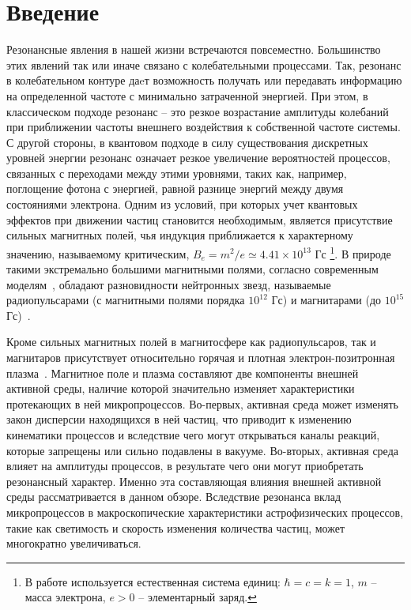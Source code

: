 \section{Введение}
Резонансные явления в нашей жизни встречаются повсеместно. Большинство этих явлений так или иначе связано с колебательными процессами. Так, резонанс в колебательном контуре даeт возможность получать или передавать информацию 
на определенной частоте с минимально затраченной энергией. При этом, в 
классическом подходе резонанс -- это резкое возрастание амплитуды колебаний при 
приближении частоты внешнего воздействия к собственной частоте системы. С 
другой стороны, в квантовом подходе в силу существования дискретных уровней 
энергии резонанс означает резкое увеличение вероятностей процессов, связанных с 
переходами между этими уровнями, таких как, например, поглощение фотона с 
энергией, равной разнице энергий между двумя состояниями электрона. Одним из 
условий, при которых учет квантовых эффектов при движении частиц становится 
необходимым, является присутствие сильных магнитных полей, чья индукция 
приближается к характерному значению, называемому критическим, $B_e = m^2 / e 
\simeq 4.41 \times 10^{13}$ Гс \footnote{В работе используется естественная 
система единиц: $\hbar = c = k = 1$, $m$ -- масса электрона, $e > 0$ --  
элементарный заряд.}. В природе такими экстремально большими магнитными полями, 
согласно современным моделям~\cite{Duncan:1995,Thompson:1996,Thompson:2002}, 
обладают разновидности нейтронных звезд, называемые радиопульсарами (с 
магнитными полями порядка $10^{12}$ Гс) и магнитарами (до $10^{15}$ 
Гс)~\cite{McGill:Cite}.

Кроме сильных магнитных полей в магнитосфере как радиопульсаров, так и магнитаров присутствует относительно горячая и плотная электрон-позитронная плазма~\cite{Duncan:1995}. Магнитное поле и плазма составляют 
две компоненты внешней активной среды, наличие которой значительно изменяет характеристики протекающих в ней микропроцессов. Во-первых, активная среда может изменять закон дисперсии 
находящихся в ней частиц, что приводит к изменению кинематики процессов и вследствие чего могут открываться  каналы реакций, которые запрещены или сильно подавлены в вакууме. Во-вторых, активная среда 
влияет на амплитуды процессов, в результате чего они могут приобретать резонансный характер. Именно эта составляющая влияния внешней активной среды рассматривается в данном обзоре. 
Вследствие резонанса вклад микропроцессов в макроскопические характеристики астрофизических процессов, такие как светимость и скорость изменения количества частиц, может 
многократно увеличиваться.


